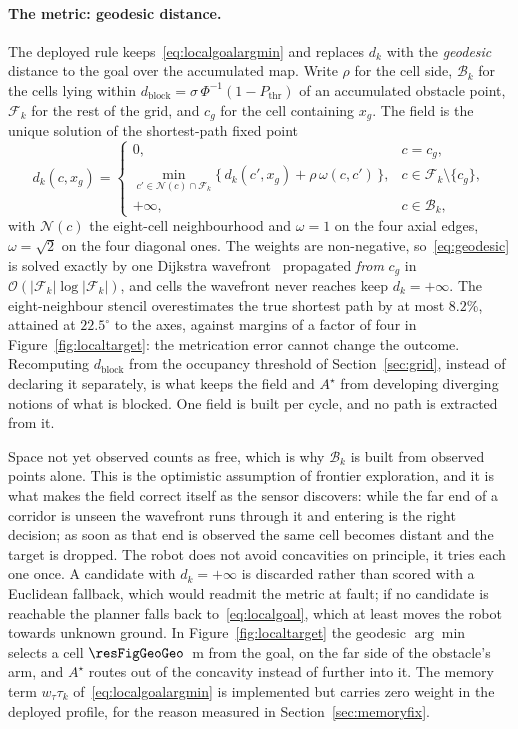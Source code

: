 \documentclass[11pt,a4paper]{article}
\newcommand{\astar}{$A^\star$}
\begin{document}
\paragraph{The metric: geodesic distance.} The deployed rule keeps~\eqref{eq:localgoalargmin} and replaces
$d_k$ with the \emph{geodesic} distance to the goal over the accumulated map. Write $\rho$ for the cell
side, $\mathcal{B}_k$ for the cells lying within
$d_{\mathrm{block}}=\sigma\,\Phi^{-1}(1-P_{\mathrm{thr}})$ of an accumulated obstacle point,
$\mathcal{F}_k$ for the rest of the grid, and $c_g$ for the cell containing $x_g$. The field is the unique
solution of the shortest-path fixed point
\begin{equation}
  d_k(c,x_g)=
  \begin{cases}
    0, & c=c_g,\\[3pt]
    \displaystyle\min_{c'\in\mathcal{N}(c)\cap\mathcal{F}_k}
      \Big\{\,d_k(c',x_g)+\rho\,\omega(c,c')\,\Big\}, & c\in\mathcal{F}_k\setminus\{c_g\},\\[5pt]
    +\infty, & c\in\mathcal{B}_k,
  \end{cases}
  \label{eq:geodesic}
\end{equation}
with $\mathcal{N}(c)$ the eight-cell neighbourhood and $\omega=1$ on the four axial edges,
$\omega=\sqrt{2}$ on the four diagonal ones. The weights are non-negative, so~\eqref{eq:geodesic} is solved
exactly by one Dijkstra wavefront~\cite{dijkstra1959note} propagated \emph{from} $c_g$ in
$\mathcal{O}(|\mathcal{F}_k|\log|\mathcal{F}_k|)$, and cells the wavefront never reaches keep
$d_k=+\infty$. The eight-neighbour stencil overestimates the true shortest path by at most $8.2\%$, attained at
$22.5^\circ$ to the axes, against margins of a factor of four in Figure~\ref{fig:localtarget}: the
metrication error cannot change the outcome. Recomputing $d_{\mathrm{block}}$ from the occupancy threshold of
Section~\ref{sec:grid}, instead of declaring it separately, is what keeps the field and \astar{} from
developing diverging notions of what is blocked. One field is built per cycle, and no path is extracted
from it.

Space not yet observed counts as free, which is why $\mathcal{B}_k$ is built from observed points alone.
This is the optimistic assumption of frontier exploration, and it is what makes the field correct itself as
the sensor discovers: while the far end of a corridor is unseen the wavefront runs through it and entering
is the right decision; as soon as that end is observed the same cell becomes distant and the target is
dropped. The robot does not avoid concavities on principle, it tries each one once. A candidate with
$d_k=+\infty$ is discarded rather than scored with a Euclidean fallback, which would readmit the metric at
fault; if no candidate is reachable the planner falls back to~\eqref{eq:localgoal}, which at least moves
the robot towards unknown ground. In Figure~\ref{fig:localtarget} the geodesic $\arg\min$ selects a cell
$\resFigGeoGeo$~m from the goal, on the far side of the obstacle's arm, and \astar{} routes out of the
concavity instead of further into it. The memory term $w_\tau\tau_k$ of~\eqref{eq:localgoalargmin} is
implemented but carries zero weight in the deployed profile, for the reason measured in
Section~\ref{sec:memoryfix}.
\end{document}
